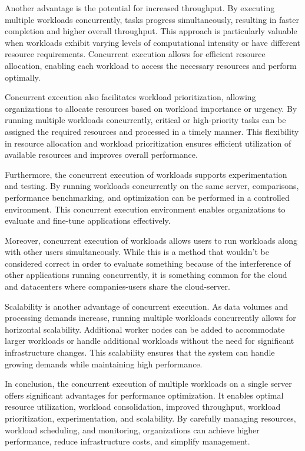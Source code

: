 Another advantage is the potential for increased throughput. By
executing multiple workloads concurrently, tasks progress
simultaneously, resulting in faster completion and higher overall
throughput. This approach is particularly valuable when workloads
exhibit varying levels of computational intensity or have different
resource requirements. Concurrent execution allows for efficient
resource allocation, enabling each workload to access the necessary
resources and perform optimally.

Concurrent execution also facilitates workload prioritization,
allowing organizations to allocate resources based on workload
importance or urgency. By running multiple workloads concurrently,
critical or high-priority tasks can be assigned the required resources
and processed in a timely manner. This flexibility in resource
allocation and workload prioritization ensures efficient utilization
of available resources and improves overall performance.

Furthermore, the concurrent execution of workloads supports
experimentation and testing. By running workloads concurrently on the
same server, comparisons, performance benchmarking, and optimization
can be performed in a controlled environment. This concurrent
execution environment enables organizations to evaluate and fine-tune
applications effectively.

Moreover, concurrent execution of workloads allows users to run
workloads along with other users simultaneously. While this is a
method that wouldn't be considered correct in order to evaluate
something because of the interference of other applications running
concurrently, it is something common for the cloud and datacenters
where companies-users share the cloud-server.

Scalability is another advantage of concurrent execution. As data
volumes and processing demands increase, running multiple workloads
concurrently allows for horizontal scalability. Additional 
worker nodes can be added to accommodate larger workloads or handle
additional workloads without the need for significant infrastructure
changes. This scalability ensures that the system can handle growing
demands while maintaining high performance.

In conclusion, the concurrent execution of multiple workloads on
a single server offers significant advantages for performance
optimization. It enables optimal resource utilization, workload
consolidation, improved throughput, workload prioritization,
experimentation, and scalability. By carefully managing resources,
workload scheduling, and monitoring, organizations can achieve higher
performance, reduce infrastructure costs, and simplify management.
\fi

